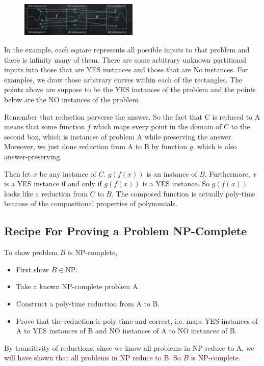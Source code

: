 \begin{figure}[H]
	\centering
	\includegraphics[width=0.5\textwidth]{fig/transitivity-reduction.png}
\end{figure}

In the example, each square represents all possible inputs to that problem and there is infinity many of them. There are some arbitrary unknown partitional inputs into those that are YES instances and those that are No instances. For examples, we draw those arbitrary curves within each of the rectangles. The points above are suppose to be the YES instances of the problem and the points below are the NO instances of the problem. 

Remember that reduction perverse the answer. So the fact that C is reduced to A means that some function $f$ which maps every point in the domain of C to the second box, which is instances of problem A while preserving the answer. Moreover, we just done reduction from A to B by function $g$, which is also answer-preserving.

Then let $x$ be any instance of $C$. $g(f(x))$ is an instance of $B$. Furthermore, $x$ is a YES instance if and only if $g(f(x))$ is a YES instance. So $g(f(x))$ looks like a reduction from $C$ to $B$. The composed function is actually poly-time because of the compositional properties of polynomials.

\subsection{Recipe For Proving a Problem NP-Complete}
To show problem $B$ is NP-complete,
\begin{itemize}
	\item First show $B \in \text{NP}$.
	\item Take a known NP-complete problem A.
	\item Construct a poly-time reduction from A to B.
	\item Prove that the reduction is poly-time and correct, i.e. maps YES instances of A to YES instances of B and NO instances of A to NO instances of B.
\end{itemize}

By transitivity of reductions, since we know all problems in NP reduce to A, we will have shown that all problems in NP reduce to B. So $B$ is NP-complete.










